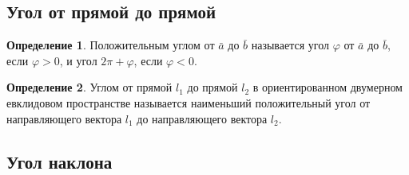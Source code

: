 \documentclass[a4paper, 12pt]{article}
\renewcommand{\phi}{\varphi}
\theoremstyle{definition}
\newtheorem*{definition}{Определение}
\begin{document}
	\subsection{Угол от прямой до прямой}
	\begin{definition}
		Положительным углом от $\bar{a}$ до $\bar{b}$ называется угол $\phi$ от $\bar{a}$ до $\bar{b}$, если $\phi > 0$, и угол $2\pi + \phi$, если $\phi < 0$.
	\end{definition}
	\begin{definition}
		Углом от прямой $l_{1}$ до прямой $l_{2}$ в ориентированном двумерном евклидовом пространстве называется наименьший положительный угол от направляющего вектора $l_{1}$ до направляющего вектора $l_{2}$.
	\end{definition}
	\subsection{Угол наклона}
\end{document}

